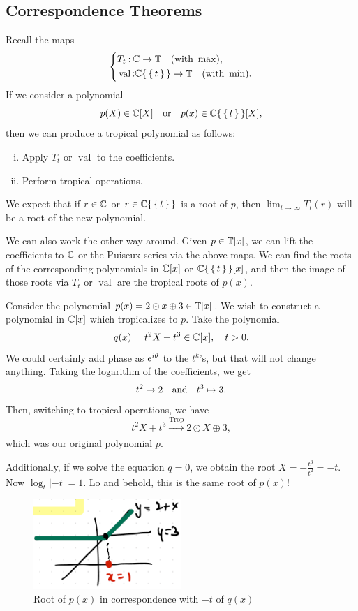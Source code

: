 \documentclass[12pt]{memoir}
\DeclareMathOperator{\val}{val}
\DeclareMathOperator{\Trop}{Trop}
\theoremstyle{definition}
\begin{document}
\subsection{Correspondence Theorems}
Recall the maps
$$
\left\lbrace 
\begin{aligned}
    &T_t\: \bC\to\bT\quad(\text{with }\max),\\
    &\val\: \bC\set{\set{t}}\to\bT\quad(\text{with }\min).
\end{aligned}
\right.
$$
If we consider a polynomial 
$$p(X)\in\mathbb{C}[X]\quad\text{or}\quad p(x)\in\mathbb{C}\{\,\{\,t\,\}\,\}[X],$$
then we can produce a tropical polynomial as follows:

\begin{enumerate}[i.]
    \item Apply $T_t$ or $\val$ to the coefficients.
    \item Perform tropical operations.
\end{enumerate}

We expect that if $r\in\mathbb{C}$ or $r\in\mathbb{C}\{\,\{\,t\,\}\,\}$ is a root of $p$, then $\lim_{t\to\infty}T_t(r)$ will be a root of the new polynomial.\par
We can also work the other way around. Given $p\in\mathbb{T}[x]$, we can lift the coefficients to $\mathbb{C}$ or the Puiseux series via the above maps. We can find the roots of the corresponding polynomials in $\mathbb{C}[x]$ or $\mathbb{C}\{\,\{\,t\,\}\,\}[x]$, and then the image of those roots via $T_t$ or $\val$ are the tropical roots of $p(x)$.

\begin{Ex}
    Consider the polynomial $p(x)=2\odot x\oplus3\in\mathbb{T}[x]$. We wish to construct a polynomial in $\mathbb{C}[x]$ which tropicalizes to $p$. Take the polynomial 
    $$q(x)=t^2X+t^3\in\mathbb{C}[x],\quad t>0.$$ 
    We could certainly add phase as $e^{i\theta}$ to the $t^k$'s, but that will not change anything. Taking the logarithm of the coefficients, we get 
    $$t^2\mapsto 2\quad\text{and}\quad t^3\mapsto 3.$$ 
    Then, switching to tropical operations, we have
    $$t^2X+t^3\xrightarrow[]{\Trop}2\odot X\oplus 3,$$ 
    which was our original polynomial $p$.\par 
    Additionally, if we solve the equation $q=0$, we obtain the root $X=-\frac{t^3}{t^2}=-t$. Now $\log_t|-t|=1$. Lo and behold, this is the same root of $p(x)$! 
    \begin{figure}[h!]
        \centering
        \includegraphics[width=0.5\textwidth]{figs/fig4-4CorrespondenceRoots1Example.png}
        \caption{Root of $p(x)$ in correspondence with $-t$ of $q(x)$}
        \label{fig:4.4-CorrespondenceRoots1Example}
    \end{figure}
\end{Ex}
\end{document}
